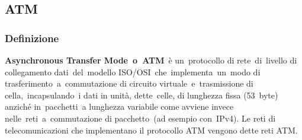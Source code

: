 \documentclass[8pt]{extarticle}
\begin{document}
\subsection{ATM}
\subsubsection{Definizione}
\noindent
\textbf{Asynchronous Transfer Mode o ATM} è un protocollo di rete di livello di collegamento dati del modello 
ISO/OSI che implementa un modo di trasferimento a commutazione di circuito virtuale e trasmissione di 
cella, incapsulando i dati in unità, dette celle, di lunghezza fissa (53 byte) anziché in pacchetti a 
lunghezza variabile come avviene invece nelle reti a commutazione di pacchetto (ad esempio con IPv4). 
Le reti di telecomunicazioni che implementano il protocollo ATM vengono dette reti ATM.
\end{document}
